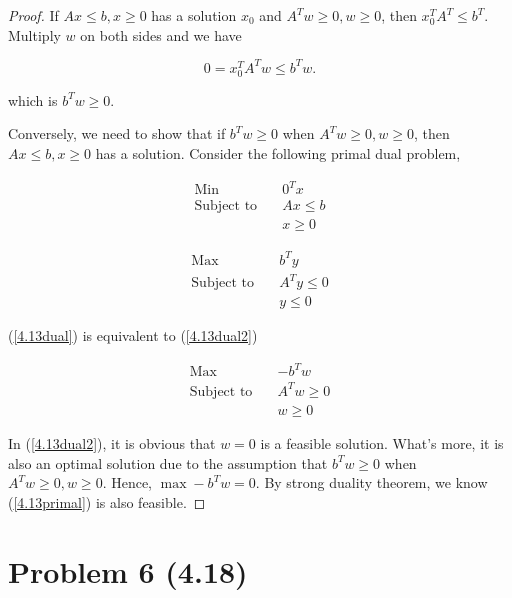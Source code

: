 \documentclass[12pt]{article}
\begin{document}
\begin{proof}

If $Ax \leqslant b, x\geqslant 0$ has a solution $x_0$ and $A^Tw \geqslant 0, w\geqslant 0$, then $x_0^TA^T\leqslant b^T$. Multiply $w$ on both sides and we have 

$$
0 = x_0^TA^Tw \leqslant b^Tw.
$$

which is $b^Tw \geqslant 0$.


Conversely, we need to show that if $b^Tw\geqslant 0$ when $A^Tw \geqslant 0, w\geqslant 0$, then $Ax \leqslant b, x\geqslant 0$ has a solution. Consider the following primal dual problem,

\begin{equation}\label{4.13primal}
\begin{aligned}
\text{Min} \quad  & 0^Tx \\
\text{Subject to} \quad & Ax \leqslant b \\
& x\geqslant 0
\end{aligned}
\end{equation}

\begin{equation}\label{4.13dual}
\begin{aligned}
\text{Max} \quad  & b^Ty \\
\text{Subject to} \quad & A^Ty \leqslant 0 \\
& y\leqslant 0
\end{aligned}
\end{equation}

(\ref{4.13dual}) is equivalent to (\ref{4.13dual2})

\begin{equation}\label{4.13dual2}
\begin{aligned}
\text{Max} \quad  & -b^Tw \\
\text{Subject to} \quad & A^Tw \geqslant 0 \\
& w\geqslant 0
\end{aligned}
\end{equation}

In (\ref{4.13dual2}), it is obvious that $w=0$ is a feasible solution. What's more, it is also an optimal solution due to the assumption that $b^Tw \geqslant 0$ when $A^Tw \geqslant 0, w\geqslant 0$. Hence, $\max -b^Tw = 0$. By strong duality theorem, we know (\ref{4.13primal}) is also feasible.


\end{proof}

\section*{Problem 6 (4.18)}
\end{document}
